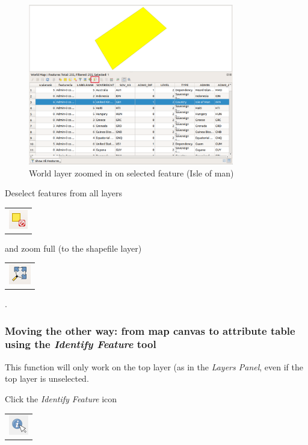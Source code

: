 \begin{figure}[!h]
	\centering
	\includegraphics[width=0.8\textwidth]{images/world_map_1_select_zoom.png}
	\caption{World layer zoomed in on selected feature (Isle of man)}
	\label{ft_fig_firstfig3}
\end{figure}

Deselect features from all layers
\begin{tabular}{@{}c@{}}\includegraphics[width=4ex]{images/deselect_features_icon.png}\end{tabular}
and zoom full (to the shapefile layer)     
\begin{tabular}{@{}c@{}}\includegraphics[width=4ex]{images/full_zoom_icon.png}\end{tabular}
.

\subsubsection{Moving the other way: from map canvas to attribute table using the \textit{Identify Feature} tool}

This function will only work on the top layer (as in the \textit{Layers Panel}, even if the top layer is unselected.

Click the \textit{Identify Feature} icon 
\begin{tabular}{@{}c@{}}\includegraphics[width=4ex]{images/identify_feature_icon.png}\end{tabular}

